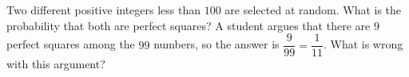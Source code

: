 Two different positive integers less than $100$ are selected at random. What is the probability that both are perfect squares? A student argues that there are $9$ perfect squares among the $99$ numbers, so the answer is $\dfrac{9}{99}=\dfrac{1}{11}$. What is wrong with this argument?
